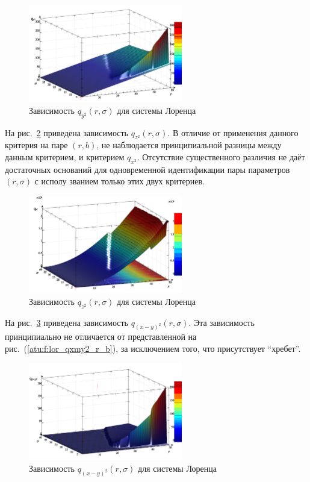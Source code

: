 \begin{figure}[h!]
  \centerline{  \includegraphics[width=0.60\textwidth]{p/cha/lor/q2d/lor_qy2_r_sigma.png}  }
  \caption{Зависимость $q_{y^2}(r,\sigma)$ для системы Лоренца}
  \label{atu:f:lor_qy2_r_sigma}
\end{figure}

На рис.~\ref{atu:f:lor_qz2_r_sigma} приведена зависимость
$q_{z^2}(r,\sigma)$. В отличие от применения данного
критерия на паре $(r,b)$, не наблюдается принципиальной
разницы между данным критерием, и критерием $q_{x^2}$.
Отсутствие существенного различия не даёт достаточных
оснований для одновременной идентификации
пары параметров $(r,\sigma)$ с исполу званием только этих
двух критериев.

\begin{figure}[h!]
  \centerline{  \includegraphics[width=0.60\textwidth]{p/cha/lor/q2d/lor_qz2_r_sigma.png}  }
  \caption{Зависимость $q_{z^2}(r,\sigma)$ для системы Лоренца}
  \label{atu:f:lor_qz2_r_sigma}
\end{figure}

На рис.~\ref{atu:f:lor_qxmy2_r_sigma} приведена зависимость
$q_{(x-y)^2}(r,\sigma)$. Эта зависимость принципиально не отличается
от представленной на рис.~(\ref{atu:f:lor_qxmy2_r_b}),
за исключением того, что присутствует ``хребет''.

\begin{figure}[h!]
  \centerline{  \includegraphics[width=0.60\textwidth]{p/cha/lor/q2d/lor_qxmy2_r_sigma.png}  }
  \caption{Зависимость $q_{(x-y)^2}(r,\sigma)$ для системы Лоренца}
  \label{atu:f:lor_qxmy2_r_sigma}
\end{figure}


